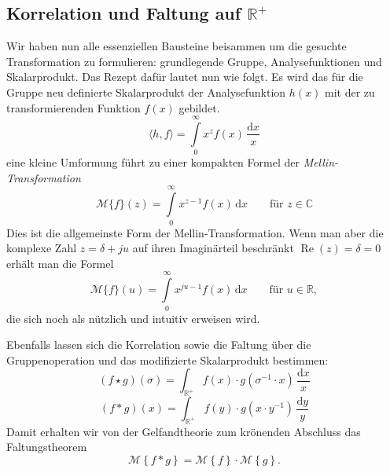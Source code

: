 \subsection{Korrelation und Faltung auf $\mathbb{R^+}$
\label{mellin:subsection:faltung}}
Wir haben nun alle essenziellen Bausteine beisammen um die gesuchte 
Transformation zu formulieren: grundlegende Gruppe, Analysefunktionen 
und Skalarprodukt.
Das Rezept dafür lautet nun wie folgt. Es wird das für die Gruppe neu 
definierte Skalarprodukt der Analysefunktion $h(x)$ mit der zu 
transformierenden Funktion $f(x)$ gebildet.
\begin{equation}
    \langle h,f \rangle 
    = \int\limits_{0}^{\infty} x^{z} f(x) \,\frac{\mathrm{d}x}{x}
\end{equation}
eine kleine Umformung führt zu einer kompakten Formel der 
\emph{Mellin-Transformation}
\begin{equation}
    \mathcal{M}\{f \}(z) 
    = \int\limits_{0}^{\infty} x^{z-1} f(x) \,\mathrm{d}x 
    \qquad\text{für $z \in \mathbb{C}$}
    \label{mellin:mellin}
\end{equation}
Dies ist die allgemeinste Form der Mellin-Transformation. 
Wenn man aber die komplexe Zahl $z = \delta + ju$ auf ihren Imaginärteil 
beschränkt $\operatorname{Re}(z) = \delta = 0$ erhält man die Formel
\begin{equation}
    \mathcal{M}\{f \}(u) 
    = \int\limits_{0}^{\infty} x^{ju-1} f(x) \,\mathrm{d}x 
    \qquad\text{für $u \in \mathbb{R}$}
    ,
    \label{mellin:mellinu}
\end{equation}
die sich noch als nützlich und intuitiv erweisen wird.

Ebenfalls lassen sich die Korrelation sowie die Faltung über die 
Gruppenoperation und das modifizierte Skalarprodukt bestimmen:
\begin{equation}
    (f \star g)(\sigma ) 
    = \int_\mathbb{R^+} 
    f(x) \cdot g(\sigma ^{-1} \cdot x)\,\frac{\mathrm{d}x}{x}
    \label{mellin:kreuzkorrelation*}
\end{equation}
\begin{equation}
    (f \ast g)(x) 
    = \int_\mathbb{R^+} 
    f(y) \cdot g(x \cdot y^{-1})\,\frac{\mathrm{d}y}{y} 
\end{equation}
Damit erhalten wir von der Gelfandtheorie zum krönenden Abschluss das 
Faltungstheorem
\begin{equation}
    \mathcal{M}\left\{f \ast g\right\} 
    = \mathcal{M}\left\{f\right\} \cdot \mathcal{M}\left\{g\right\}
    .
\end{equation}

